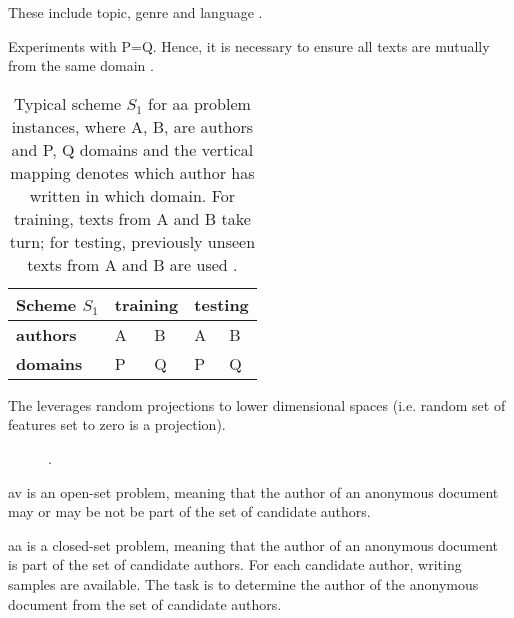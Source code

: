 \begin{definition}
    These include topic, genre and language \citep{bischoff_importance_2020}.
\end{definition}

\begin{definition}
    Experiments with P=Q.
    Hence, it is necessary to ensure all texts are mutually from the same domain \citep{bischoff_importance_2020}.
    \begin{table}[tbp]
        \centering
        \caption{Typical scheme $S_1$ for \ac{aa} problem instances, where A, B, are authors and P, Q domains and 
        the vertical mapping denotes which author has written in which domain. 
        For training, texts from A and B take turn; for testing, previously unseen texts from A and B are used \citep{bischoff_importance_2020}.}
        \label{tab:within_domain_aa}
        \begin{tabular}{|l|ll|ll|}
        \hline
        \textbf{Scheme $S_1$} & \multicolumn{2}{l|}{\textbf{training}} & \multicolumn{2}{l|}{\textbf{testing}} \\ \hline
        \textbf{authors} & \multicolumn{1}{l|}{A} & B & \multicolumn{1}{l|}{A} & B \\ \hline
        \textbf{domains} & \multicolumn{1}{l|}{P} & Q & \multicolumn{1}{l|}{P} & Q \\ \hline
        \end{tabular}%
    \end{table}
\end{definition}


The \impAppr{} leverages random projections to lower dimensional spaces (i.e. random set of features set to zero is a projection).
\begin{figure}[htbp]
    \centering
    
    \caption{\imp{}.}
    \label{fig:impostor}
\end{figure}

\ac{av} is an open-set problem, meaning that the author of an anonymous document 
may or may be not be part of the set of candidate authors.

\ac{aa} is a closed-set problem, meaning that the author of an anonymous document
is part of the set of candidate authors.
For each candidate author, writing samples are available.
The task is to determine the author of the anonymous document from the set of candidate authors.

